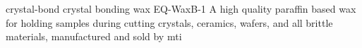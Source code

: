 \newglsXchemical%
{crystal-bond}%
{crystal bonding wax}%
{EQ{\--}WaxB{\--}1}%
{A high quality paraffin based wax for holding samples during cutting crystals, ceramics, wafers, and all brittle materials, manufactured and sold by \gls{mti}}%